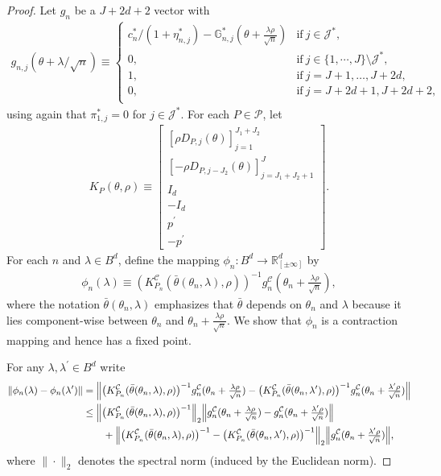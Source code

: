 \documentclass[letterpaper,11pt]{article}
\theoremstyle{myplain}
\theoremstyle{mydefinition}
\theoremstyle{myremark}
\newcommand{\G}{\mathbb{G}}
\newcommand{\R}{\mathbb{R}}
\newcommand{\cC}{\mathcal{C}}
\newcommand{\cJ}{\mathcal{J}}
\newcommand{\larhon}{\frac{\lambda \rho }{\sqrt n}}
\newcommand{\tlarhon}{\tfrac{\lambda \rho }{\sqrt n}}
\numberwithin{equation}{section}
\numberwithin{figure}{section}
\begin{document}
\begin{appendices}
\begin{proof}
Let $g_n$ be a $J+2d+2$ vector with
\begin{align}
\label{eq:tilde_g}
g_{n,j}(\theta+\lambda/\sqrt{n})\equiv \left\{ \begin{array}{llll}
c^{*}_{n}/(1+\eta^*_{n,j})-\G^*_{n,j}(\theta+\larhon) &  \mathrm{if}~j \in \cJ^*,\\
0, & \mathrm{if}~j\in\{1,\cdots,J\}\setminus\cJ^*,\\
1, &  \mathrm{if}~j=J+1,\dots,J+2d,\\
0, & \mathrm{if}~j=J+2d+1,J+2d+2,\\
	\end{array} 
	\right. 
\end{align}
using again that $\pi_{1,j}^*=0$ for $j \in \cJ^*$. For each $P\in\mathcal P$, let
\begin{align}
K_P(\theta,\rho) \equiv 
\begin{bmatrix}
[\rho D_{P,j}(\theta)]_{j=1}^{J_1+J_2}\\
[-\rho D_{P,j-J_2}(\theta)]_{j=J_1+J_2+1}^J\\
I_d\\
-I_d\\
p^\prime\\
-p^\prime
\end{bmatrix}. \label{eq:KP}
\end{align}
For each $n$ and $\lambda \in B^d$, define the mapping $\phi_{n}:B^d\to \R^d_{[\pm \infty]}$ by
\begin{align}
\label{eq:phi_fp}
\phi_{n}(\lambda) \equiv \left(K_{P_{n}}^{\cC}(\bar\theta(\theta_{n},\lambda),\rho )\right)^{-1} g^{\cC}_{n}(\theta_{n} + \tlarhon),
\end{align}
where the notation $\bar\theta(\theta_n,\lambda)$ emphasizes that $\bar{\theta}$ depends on $\theta_n$ and $\lambda$ because it lies component-wise between $\theta_n$ and $\theta_n + \larhon$.
We show that $\phi_{n}$ is a contraction mapping and hence has a fixed point.

For any $\lambda,\lambda^\prime \in B^d$ write
\begin{align}
\Vert \phi_{n}(\lambda) - \phi_{n}(\lambda^\prime) \Vert \notag&= \Big\Vert \big(K_{P_{n}}^{\cC}(\bar\theta(\theta_{n},\lambda),\rho )\big)^{-1}g^{\cC}_{n}(\theta_{n}+\tlarhon)- \big(K_{P_{n}}^{\cC}(\bar\theta(\theta_{n},\lambda^\prime),\rho )\big)^{-1}g^{\cC}_{n}(\theta_{n}+\tfrac{\lambda^\prime \rho }{\sqrt{n}}) \Big\Vert \notag\\
&\le \Big\Vert \big(K_{P_{n}}^{\cC}(\bar\theta(\theta_{n},\lambda),\rho )\big)^{-1} \Big\Vert_2 \Big\Vert g^{\cC}_{n}(\theta_{n}+\tlarhon)- g^{\cC}_{n}(\theta_{n}+\tfrac{\lambda^\prime \rho }{\sqrt{n}}) \Big\Vert \notag\\
&\qquad+\Big\Vert \big(K_{P_{n}}^{\cC}(\bar\theta(\theta_{n},\lambda),\rho )\big)^{-1}- \big(K_{P_{n}}^{\cC}(\bar\theta(\theta_{n},\lambda^\prime),\rho )\big)^{-1}\Big\Vert_2 \Big\Vert g^{\cC}_{n}(\theta_{n}+\tfrac{\lambda^\prime \rho }{\sqrt{n}}) \Big\Vert,\label{eq:phi_decomp}
\end{align}
where $\|\cdot\|_2$ denotes the spectral norm (induced by the Euclidean norm).


\end{proof}
\end{appendices}
\end{document}

